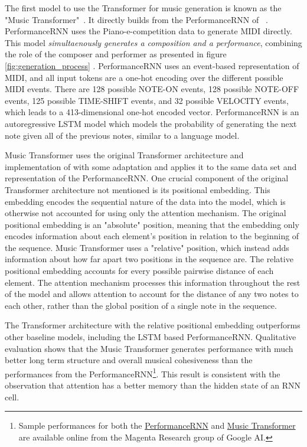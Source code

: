 The first model to use the Transformer for music generation is known as the "Music Transformer"~\cite{huang2018music}. It directly builds from the PerformanceRNN of ~\citet{oore2020time}. PerformanceRNN uses the Piano-e-competition data to generate MIDI directly. This model \emph{simultaenously generates a composition and a performance}, combining the role of the composer and performer as presented in figure \ref{fig:generation_process} . PerformanceRNN uses an event-based representation of MIDI, and all input tokens are a one-hot encoding over the different possible MIDI events. There are 128 possible NOTE-ON events, 128 possible NOTE-OFF events, 125 possible TIME-SHIFT events, and 32 possible VELOCITY events, which leads to a 413-dimensional one-hot encoded vector. PerformanceRNN is an autoregressive LSTM model which models the probability of generating the next note given all of the previous notes, similar to a language model. 

Music Transformer uses the original Transformer architecture and implementation of \citet{vaswani2017attention} with some adaptation and applies it to the same data set and representation of the PerformanceRNN. One crucial component of the original Transformer architecture not mentioned is its positional embedding. This embedding encodes the sequential nature of the data into the model, which is otherwise not accounted for using only the attention mechanism. The original positional embedding is an "absolute" position, meaning that the embedding only encodes information about each element's position in relation to the beginning of the sequence. Music Transformer uses a "relative" position, which instead adds information about how far apart two positions in the sequence are. The relative positional embedding accounts for every possible pairwise distance of each element. The attention mechanism processes this information throughout the rest of the model and allows attention to account for the distance of any two notes to each other, rather than the global position of a single note in the sequence. 

The Transformer architecture with the relative positional embedding outperforms other baseline models, including the LSTM based PerformanceRNN. Qualitative evaluation shows that the Music Transformer generates performance with much better long term structure and overall musical cohesiveness than the performances from the PerformanceRNN\footnote{Sample performances for both the \href{https://magenta.tensorflow.org/performance-rnn}{PerformanceRNN} and \href{https://magenta.tensorflow.org/music-transformer}{Music Transformer} are  available online from the Magenta Research group of Google AI.}. This result is consistent with the observation that attention has a better memory than the hidden state of an RNN cell. 

